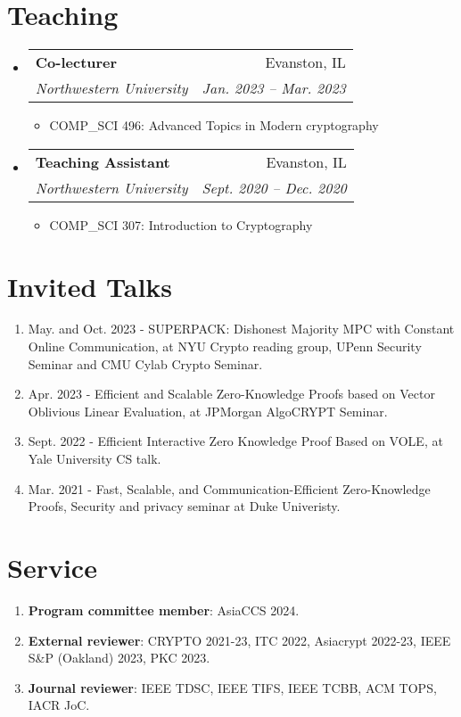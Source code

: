 \documentclass[letterpaper,11pt]{article}
\makeatletter
\newcommand{\resumeItem}[1]{
  \item\small{
    {#1 \vspace{-2pt}}
  }
}
\newcommand{\resumeSubheading}[4]{
  \vspace{-2pt}\item
    \begin{tabular*}{0.97\textwidth}[t]{l@{\extracolsep{\fill}}r}
      \textbf{#1} & #2 \\
      \textit{\small#3} & \textit{\small #4} \\
    \end{tabular*}\vspace{-7pt}
}
\newcommand{\resumeSubHeadingListStart}{\begin{itemize}[leftmargin=0.15in, label={}]}
\newcommand{\resumeSubHeadingListEnd}{\end{itemize}}
\newcommand{\resumeItemListStart}{\begin{itemize}}
\newcommand{\resumeItemListEnd}{\end{itemize}\vspace{-5pt}}
\makeatother
\begin{document}
\section{Teaching}
  \resumeSubHeadingListStart

     \resumeSubheading
      {Co-lecturer}{Evanston, IL}
      {Northwestern University}{Jan. 2023 -- Mar. 2023}
      \resumeItemListStart
        \resumeItem{COMP\_SCI 496: Advanced Topics in Modern cryptography}
      \resumeItemListEnd

     \resumeSubheading
      {Teaching Assistant}{Evanston, IL}
      {Northwestern University}{Sept. 2020 -- Dec. 2020}
      \resumeItemListStart
        \resumeItem{COMP\_SCI 307: Introduction to Cryptography}
      \resumeItemListEnd


  \resumeSubHeadingListEnd


\section{Invited Talks}
\begin{enumerate}[leftmargin=0.20in]
  \item
    \small May. and Oct. 2023 - SUPERPACK: Dishonest Majority MPC with Constant Online Communication, at NYU Crypto reading group, UPenn Security Seminar and CMU Cylab Crypto Seminar.
  \item
    \small Apr. 2023 - Efficient and Scalable Zero-Knowledge Proofs based on Vector Oblivious Linear Evaluation, at JPMorgan AlgoCRYPT Seminar.
  \item
	  \small Sept. 2022 - Efficient Interactive Zero Knowledge Proof Based on VOLE, at Yale University CS talk.
  \item
	  \small Mar. 2021 - Fast, Scalable, and Communication-Efficient Zero-Knowledge Proofs, Security and privacy seminar at Duke Univeristy.
\end{enumerate}

\section{Service}
\begin{enumerate}[leftmargin=0.15in, label={}]
  \item \textbf{Program committee member}: AsiaCCS 2024.
  \item \textbf{External reviewer}: CRYPTO 2021-23, ITC 2022, Asiacrypt 2022-23, IEEE S\&P (Oakland) 2023, PKC 2023.
    \item \textbf{Journal reviewer}: IEEE TDSC, IEEE TIFS, IEEE TCBB, ACM TOPS, IACR JoC.
\end{enumerate}
%
\end{document}
